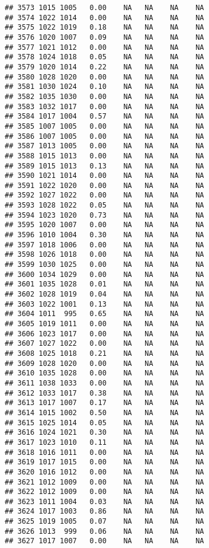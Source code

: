 \documentclass{article}\usepackage{graphicx, color}
\makeatletter
\newenvironment{kframe}{%
 \def\at@end@of@kframe{}%
 \ifinner\ifhmode%
  \def\at@end@of@kframe{\end{minipage}}%
  \begin{minipage}{\columnwidth}%
 \fi\fi%
 \def\FrameCommand##1{\hskip\@totalleftmargin \hskip-\fboxsep
 \colorbox{shadecolor}{##1}\hskip-\fboxsep
     \hskip-\linewidth \hskip-\@totalleftmargin \hskip\columnwidth}%
 \MakeFramed {\advance\hsize-\width
   \@totalleftmargin\z@ \linewidth\hsize
   \@setminipage}}%
 {\par\unskip\endMakeFramed%
 \at@end@of@kframe}
\newenvironment{knitrout}{}{} %
\makeatother
\begin{document}
\begin{knitrout}
\begin{kframe}
\begin{verbatim}
## 3573 1015 1005   0.00    NA   NA    NA    NA
## 3574 1022 1014   0.00    NA   NA    NA    NA
## 3575 1022 1019   0.18    NA   NA    NA    NA
## 3576 1020 1007   0.09    NA   NA    NA    NA
## 3577 1021 1012   0.00    NA   NA    NA    NA
## 3578 1024 1018   0.05    NA   NA    NA    NA
## 3579 1020 1014   0.22    NA   NA    NA    NA
## 3580 1028 1020   0.00    NA   NA    NA    NA
## 3581 1030 1024   0.10    NA   NA    NA    NA
## 3582 1035 1030   0.00    NA   NA    NA    NA
## 3583 1032 1017   0.00    NA   NA    NA    NA
## 3584 1017 1004   0.57    NA   NA    NA    NA
## 3585 1007 1005   0.00    NA   NA    NA    NA
## 3586 1007 1005   0.00    NA   NA    NA    NA
## 3587 1013 1005   0.00    NA   NA    NA    NA
## 3588 1015 1013   0.00    NA   NA    NA    NA
## 3589 1015 1013   0.13    NA   NA    NA    NA
## 3590 1021 1014   0.00    NA   NA    NA    NA
## 3591 1022 1020   0.00    NA   NA    NA    NA
## 3592 1027 1022   0.00    NA   NA    NA    NA
## 3593 1028 1022   0.05    NA   NA    NA    NA
## 3594 1023 1020   0.73    NA   NA    NA    NA
## 3595 1020 1007   0.00    NA   NA    NA    NA
## 3596 1010 1004   0.30    NA   NA    NA    NA
## 3597 1018 1006   0.00    NA   NA    NA    NA
## 3598 1026 1018   0.00    NA   NA    NA    NA
## 3599 1030 1025   0.00    NA   NA    NA    NA
## 3600 1034 1029   0.00    NA   NA    NA    NA
## 3601 1035 1028   0.01    NA   NA    NA    NA
## 3602 1028 1019   0.04    NA   NA    NA    NA
## 3603 1022 1001   0.13    NA   NA    NA    NA
## 3604 1011  995   0.65    NA   NA    NA    NA
## 3605 1019 1011   0.00    NA   NA    NA    NA
## 3606 1023 1017   0.00    NA   NA    NA    NA
## 3607 1027 1022   0.00    NA   NA    NA    NA
## 3608 1025 1018   0.21    NA   NA    NA    NA
## 3609 1028 1020   0.00    NA   NA    NA    NA
## 3610 1035 1028   0.00    NA   NA    NA    NA
## 3611 1038 1033   0.00    NA   NA    NA    NA
## 3612 1033 1017   0.38    NA   NA    NA    NA
## 3613 1017 1007   0.17    NA   NA    NA    NA
## 3614 1015 1002   0.50    NA   NA    NA    NA
## 3615 1025 1014   0.05    NA   NA    NA    NA
## 3616 1024 1021   0.30    NA   NA    NA    NA
## 3617 1023 1010   0.11    NA   NA    NA    NA
## 3618 1016 1011   0.00    NA   NA    NA    NA
## 3619 1017 1015   0.00    NA   NA    NA    NA
## 3620 1016 1012   0.00    NA   NA    NA    NA
## 3621 1012 1009   0.00    NA   NA    NA    NA
## 3622 1012 1009   0.00    NA   NA    NA    NA
## 3623 1011 1004   0.03    NA   NA    NA    NA
## 3624 1017 1003   0.86    NA   NA    NA    NA
## 3625 1019 1005   0.07    NA   NA    NA    NA
## 3626 1013  999   0.06    NA   NA    NA    NA
## 3627 1017 1007   0.00    NA   NA    NA    NA

\end{verbatim}
\end{kframe}
\end{knitrout}
\end{document}
